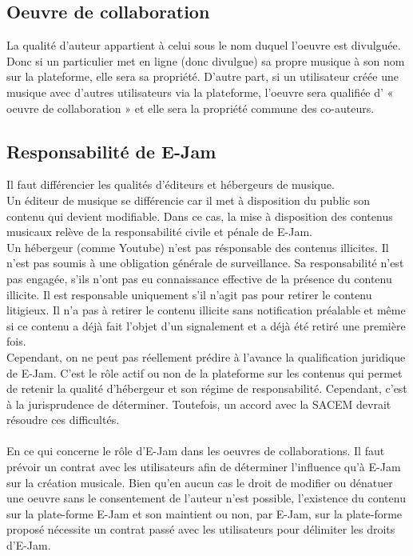 \documentclass[a4,12pt]{article}
\begin{document}
\subsection{Oeuvre de collaboration}

La qualité d’auteur appartient à celui sous le nom duquel l’oeuvre est divulguée.\\
Donc si un particulier met en ligne (donc divulgue) sa propre musique à son nom sur la plateforme, elle sera sa propriété. D’autre part, si un utilisateur créée une musique avec d’autres utilisateurs via la plateforme, l’oeuvre sera qualifiée d’ « oeuvre de collaboration » et elle sera la propriété commune des co-auteurs.

\subsection{Responsabilité de E-Jam}

Il faut différencier les qualités d'éditeurs et hébergeurs de musique.\\
Un éditeur de musique se différencie car il met à disposition du public son contenu qui devient modifiable. Dans ce cas, la mise à disposition des contenus musicaux relève de la responsabilité civile et pénale de E-Jam.\\
Un hébergeur (comme Youtube) n'est pas résponsable des contenus illicites. Il n'est pas soumis à une obligation générale de surveillance. Sa responsabilité n'est pas engagée, s'ils n'ont pas eu connaissance effective de la présence du contenu illicite. Il est responsable uniquement s'il n'agit pas pour retirer le contenu litigieux. Il n'a pas à retirer le contenu illicite sans notification préalable et même si ce contenu a déjà fait l'objet d'un signalement et a déjà été retiré une première fois.\\
Cependant, on ne peut pas réellement prédire à l'avance la qualification juridique de E-Jam. C'est le rôle actif ou non de la plateforme sur les contenus qui permet de retenir la qualité d'hébergeur et son régime de responsabilité. Cependant, c'est à la jurisprudence de déterminer. Toutefois, un accord avec la SACEM devrait résoudre ces difficultés.\\
\\
En ce qui concerne le rôle d'E-Jam dans les oeuvres de collaborations. Il faut prévoir un contrat avec les utilisateurs afin de déterminer l'influence qu'à E-Jam sur la création musicale. Bien qu'en aucun cas le droit de modifier ou dénatuer une oeuvre sans le consentement de l'auteur n'est possible, l'existence du contenu sur la plate-forme E-Jam et son maintient ou non, par E-Jam, sur la plate-forme proposé nécessite un contrat passé avec les utilisateurs pour délimiter les droits d'E-Jam.
\newpage
\end{document}
